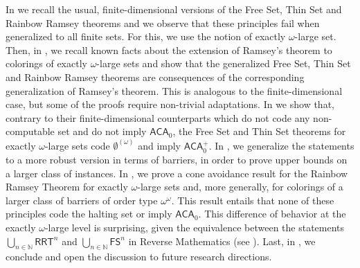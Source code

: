 \documentclass{article}
\newcommand{\Psf}{\mathsf{P}}
\newcommand{\Qsf}{\mathsf{Q}}
\newcommand{\ACA}[0]{\mathsf{ACA}}
\newcommand{\RRT}[0]{\mathsf{RRT}}
\newcommand{\FS}[0]{\mathsf{FS}}
\newcommand{\TS}[0]{\mathsf{TS}}
\newcommand{\NN}[0]{\mathbb{N}}
\numberwithin{theorem}{section}
\newcommand{\ludovic}[1]{\textcolor{blue}{#1}}
\newcommand{\lorenzo}[1]{\textcolor{orange}{#1}}
\begin{document}
In  we recall the usual, finite-dimensional versions of the Free Set, Thin Set and Rainbow Ramsey theorems and we observe that these principles fail when generalized to all finite sets. For this, we use the notion of exactly $\omega$-large set. Then, in , we recall known facts about the extension of Ramsey's theorem to colorings of exactly $\omega$-large sets and show that the generalized Free Set, Thin Set and Rainbow Ramsey theorems are consequences of the corresponding generalization of Ramsey's theorem. This is analogous to the finite-dimensional case, but some of the proofs require non-trivial adaptations. %
In  we show that, contrary to their finite-dimensional counterparts which do not code any non-computable set and do not imply $\ACA_0$, the Free Set and Thin Set theorems for exactly $\omega$-large sets code $\emptyset^{(\omega)}$ and imply $\ACA_0^+$. In , we generalize the statements to a more robust version in terms of barriers, in order to prove upper bounds on a larger class of instances. In , we prove a cone avoidance result for the Rainbow Ramsey Theorem for exactly $\omega$-large sets and, more generally, for colorings of a larger class of barriers of order type $\omega^\omega$. This result entails that none of these principles code the halting set or imply $\ACA_0$. This difference of behavior at the exactly $\omega$-large level is surprising, given the equivalence between the statements $\bigcup_{n \in \NN}\RRT^n$ and $\bigcup_{n \in \NN} \FS^n$ in Reverse Mathematics (see \cite{patey2015somewhere,wang2014some}). %
Last, in , we conclude and open the discussion to future research directions.

\end{document}
